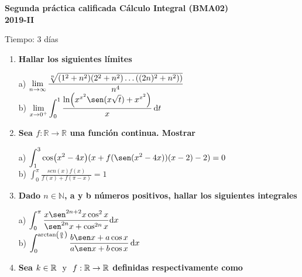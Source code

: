 {	\vspace{15pt}
	\begin{center}
		{\bf {\Large Segunda práctica calificada Cálculo Integral (BMA02) }}\\\vspace{.5 cm}
		{\bf {\large 2019-II}}
	\end{center}
	
	Tiempo: 3 días 
	\begin{enumerate} \item 
		{\bf Hallar los siguientes límites}
		\vspace{10pt}
		
			a) 
			$
			\displaystyle \lim_{n \rightarrow \infty } \frac{\sqrt[n]{\pqty{1^2+n^2}(2^2+n^2)\ldots ((2n)^2+n^2))}}{n^4}
			$
			\\
			b)
			$
			\displaystyle \lim_{x \rightarrow 0^{+} } \int_0^1 \frac{\ln ( x^{x^2}\sen(x \sqrt{t})+x^{x^2} )}{x}\, \mathrm{d}t
			$
		\item 
		{\bf Sea $f: \mathbb{R} \rightarrow \mathbb{R} $ una función continua. Mostrar } %
		\vspace{10pt}
		
		a) 
		$
		\displaystyle \int_{1}^{3} \cos (x^2-4x)(x+f(\sen (x^2-4x))(x-2)-2)=0
		$
		\\
		
		b)
		$
		\displaystyle \int_{0}^{\pi} \frac{sen(x)f(x)}{f(x)+f(\pi-x)}=1
		$
		
		\vspace{10pt}
		
		\item %
		{\bf Dado  $n \in \mathbb{N} $, a y b números positivos, hallar los siguientes integrales  } 
		\vspace{10pt}
		\begin{multicols}{2}
			
			a) 
			$
			\displaystyle \int_{0}^{\pi} \frac{x \sen^{2n+2}x \cos^2 x }{  \sen^{2n}x +\cos^{2n}x} \mathrm{d} x
			$
			\\
			b)
			$
			\displaystyle \int_{0}^{ \arctan(\frac{a}{b}) } \frac{b\sen x +a\cos x}{a\sen x+b\cos x} \, \mathrm{d} x  
			$
		\end{multicols} %
		\item %
		{\bf Sea $k \in \mathbb{R } \hspace{.25 cm}\mbox{y} \hspace{.25cm} f: \mathbb{R} \rightarrow \mathbb{R} $ definidas respectivamente como}
		

\end{enumerate}}
